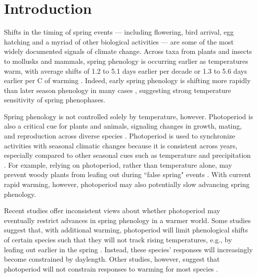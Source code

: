 \documentclass{article}
\begin{document}

\section*{Introduction}
\par Shifts in the timing of spring events --- including flowering, bird arrival, egg hatching and a myriad of other biological activities --- are some of the most widely documented signals of climate change. Across taxa from plants and insects to mollusks and mammals, spring phenology is occurring earlier as temperatures warm, with average shifts of 1.2 to 5.1 days earlier per decade \citep{bradley1999,parmesan2003, root2003} or 1.3 to 5.6 days earlier per \degree C of warming \citep{Wolkovich:2012n,polgar2013}. Indeed, early spring phenology is shifting more rapidly than later season phenology in many cases \citep{bradley1999,menzel2006}, suggesting strong temperature sensitivity of spring phenophases.

\par Spring phenology is not controlled solely by temperature, however. Photoperiod is also a critical cue for plants and animals, signaling changes in growth, mating, and reproduction across diverse species \citep[e.g.,][]{Howe:1996,flynn2018,solbakken1994,mcallan2006,lagercrantz2009}. Photoperiod is used to synchronize activities with seasonal climatic changes \citep[e.g.,][]{Hsu:2011,Singh:2017,Basler:2012} because it is consistent across years, especially compared to other seasonal cues such as temperature and precipitation \citep{saikkonen2012}. For example, relying on photoperiod, rather than temperature alone, may prevent woody plants from leafing out during ``false spring" events \citep[unusually warm periods during winter that are followed by a return of cold temperatures][] {Gu2008}. With current rapid warming, however, photoperiod may also potentially slow advancing spring phenology. 

\par Recent studies offer inconsistent views about whether photoperiod may eventually restrict advances in spring phenology in a warmer world. Some studies suggest that, with additional warming, photoperiod will limit phenological shifts of certain species such that they will not track rising temperatures, e.g., by leafing out earlier in the spring \citep{koerner2010b,way2015}. Instead, these species' responses will increasingly become constrained by daylength. Other studies, however, suggest that photoperiod will not constrain responses to warming for most species \citep{zohner2016,chuine2010}. 
\end{document}
